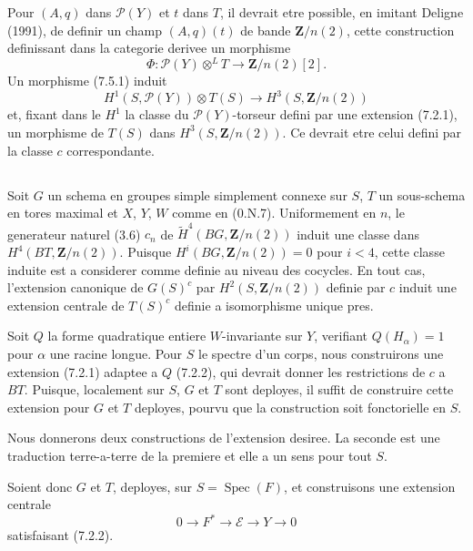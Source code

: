 \documentclass[11pt,a4paper]{article}
\theoremstyle{plain}
\theoremstyle{definition}
\DeclareMathOperator{\Spec}{Spec}
\begin{document}
Pour $(A, q)$ dans $\mathscr{P}(Y)$ et $t$ dans $T$, il devrait etre possible, en imitant Deligne (1991), de definir un champ $(A, q)(t)$ de bande $\mathbf{Z}/n(2)$, cette construction definissant dans la categorie derivee un morphisme
\begin{equation}\label{7.5.1}
\Phi : \mathscr{P}(Y) \otimes^L T \to \mathbf{Z}/n(2)[2].
\end{equation}
Un morphisme (7.5.1) induit
\begin{equation}\label{7.5.2}
H^1(S, \mathscr{P}(Y)) \otimes T(S) \to H^3(S, \mathbf{Z}/n(2))
\end{equation}
et, fixant dans le $H^1$ la classe du $\mathscr{P}(Y)$-torseur defini par une extension (7.2.1), un morphisme de $T(S)$ dans $H^3(S, \mathbf{Z}/n(2))$. Ce devrait etre celui defini par la classe $c$ correspondante.

\subsection{}\label{7.6}

Soit $G$ un schema en groupes simple simplement connexe sur $S$, $T$ un sous-schema en tores maximal et $X$, $Y$, $W$ comme en (0.N.7). Uniformement en $n$, le generateur naturel (3.6) $c_n$ de $\widetilde{H}^4(BG, \mathbf{Z}/n(2))$ induit une classe dans $H^4(BT, \mathbf{Z}/n(2))$. Puisque $H^i(BG, \mathbf{Z}/n(2)) = 0$ pour $i < 4$, cette classe induite est a considerer comme definie au niveau des cocycles. En tout cas, l'extension canonique de $G(S)^c$ par $H^2(S, \mathbf{Z}/n(2))$ definie par $c$ induit une extension centrale de $T(S)^c$ definie a isomorphisme unique pres.

Soit $Q$ la forme quadratique entiere $W$-invariante sur $Y$, verifiant $Q(H_\alpha) = 1$ pour $\alpha$ une racine longue. Pour $S$ le spectre d'un corps, nous construirons une extension (7.2.1) adaptee a $Q$ (7.2.2), qui devrait donner les restrictions de $c$ a $BT$. Puisque, localement sur $S$, $G$ et $T$ sont deployes, il suffit de construire cette extension pour $G$ et $T$ deployes, pourvu que la construction soit fonctorielle en $S$.

Nous donnerons deux constructions de l'extension desiree. La seconde est une traduction terre-a-terre de la premiere et elle a un sens pour tout $S$.

Soient donc $G$ et $T$, deployes, sur $S = \Spec(F)$, et construisons une extension centrale
\[
0 \to F^* \to \mathscr{E} \to Y \to 0
\]
satisfaisant (7.2.2).
\end{document}
